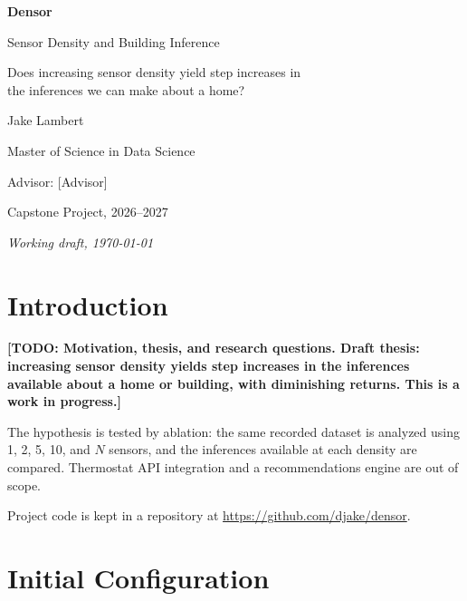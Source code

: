 \documentclass[11pt,letterpaper]{article}
\newcommand{\projecttitle}{Densor}
\newcommand{\projectsubtitle}{Sensor Density and Building Inference}
\newcommand{\authorname}{Jake Lambert}
\newcommand{\institution}{[Institution]}
\newcommand{\program}{Master of Science in Data Science}
\newcommand{\advisor}{[Advisor]}
\newcommand{\projectterm}{Capstone Project, 2026--2027}
\newcommand{\todo}[1]{\textbf{[TODO: #1]}}
\begin{document}
\begin{titlepage}
  \centering
  \vspace*{1.2in}
  {\Huge\bfseries \projecttitle\par}
  \vspace{0.4cm}
  {\Large \projectsubtitle\par}
  \vspace{1.5cm}
  {\large Does increasing sensor density yield step increases in\\
  the inferences we can make about a home?\par}
  \vfill
  {\large \authorname\par}
  \vspace{0.3cm}
  \program\\
  \institution\par
  \vspace{0.3cm}
  Advisor: \advisor\par
  \vspace{0.3cm}
  \projectterm\par
  \vspace{0.3cm}
  \textit{Working draft, \today}\par
  \vspace{0.8in}
\end{titlepage}

\tableofcontents
\clearpage

\section{Introduction}
\todo{Motivation, thesis, and research questions. Draft thesis: increasing
sensor density yields step increases in the inferences available about a home
or building, with diminishing returns. This is a work in progress.}

The hypothesis is tested by ablation: the same recorded dataset is analyzed using
1, 2, 5, 10, and $N$ sensors, and the inferences available at each density are
compared. Thermostat API integration and a recommendations engine are out of
scope.

Project code is kept in a repository at
\url{https://github.com/djake/densor}.

\section{Initial Configuration}
\label{sec:initial-config}
\end{document}
